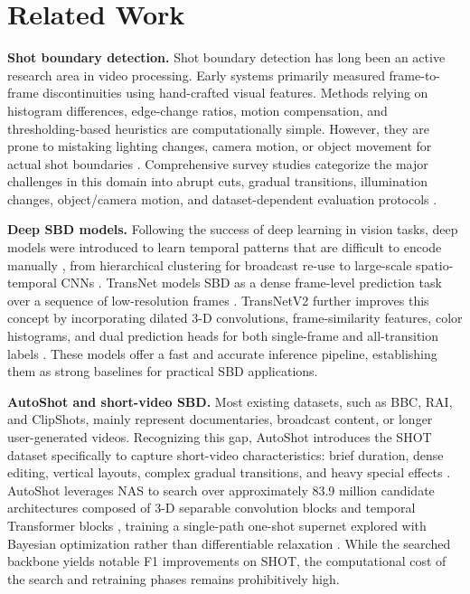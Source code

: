 \section{Related Work}

\textbf{Shot boundary detection.} Shot boundary detection has long been an active research area in video processing. Early systems primarily measured frame-to-frame discontinuities using hand-crafted visual features. Methods relying on histogram differences, edge-change ratios, motion compensation, and thresholding-based heuristics are computationally simple. However, they are prone to mistaking lighting changes, camera motion, or object movement for actual shot boundaries \cite{abdulhussain2018review}. Comprehensive survey studies categorize the major challenges in this domain into abrupt cuts, gradual transitions, illumination changes, object/camera motion, and dataset-dependent evaluation protocols \cite{seridi2020survey,kar2024review}.

\textbf{Deep SBD models.} Following the success of deep learning in vision tasks, deep models were introduced to learn temporal patterns that are difficult to encode manually \cite{tran2015c3d,esteve2023shot}, from hierarchical clustering for broadcast re-use \cite{baraldi2015shot} to large-scale spatio-temporal CNNs \cite{hassanien2017deepsbd}. TransNet models SBD as a dense frame-level prediction task over a sequence of low-resolution frames \cite{soucek2019transnet}. TransNetV2 further improves this concept by incorporating dilated 3-D convolutions, frame-similarity features, color histograms, and dual prediction heads for both single-frame and all-transition labels \cite{soucek2020transnetv2}. These models offer a fast and accurate inference pipeline, establishing them as strong baselines for practical SBD applications.

\textbf{AutoShot and short-video SBD.} Most existing datasets, such as BBC, RAI, and ClipShots, mainly represent documentaries, broadcast content, or longer user-generated videos. Recognizing this gap, AutoShot introduces the SHOT dataset specifically to capture short-video characteristics: brief duration, dense editing, vertical layouts, complex gradual transitions, and heavy special effects \cite{zhu2023autoshot}. AutoShot leverages NAS \cite{white2023_nas1000,ren2020_nas_survey,elsken2019nas} to search over approximately 83.9 million candidate architectures composed of 3-D separable convolution blocks and temporal Transformer blocks \cite{vaswani2017attention}, training a single-path one-shot supernet \cite{guo2020spos} explored with Bayesian optimization rather than differentiable relaxation \cite{liu2019darts}. While the searched backbone yields notable F1 improvements on SHOT, the computational cost of the search and retraining phases remains prohibitively high.

